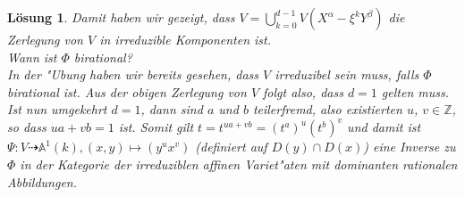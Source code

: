 \documentclass[a4paper, 12pt, numbers=noendperiod, chapterprefix=true, headsepline]{scrbook}
\theoremstyle{break}
\newtheorem{Loes}{L\"osung}
\theoremstyle{nonumberbreak}
\theoremstyle{nonumberplain}
\newcommand{\Z}{\mathbb{Z}}
\newcommand{\A}{\mathbb{A}}
\begin{document}
\begin{Loes}
Damit haben wir gezeigt, dass $V = \bigcup_{k=0}^{d-1} V(X^\alpha - \xi^k Y^\beta)$ die Zerlegung von $V$ in irreduzible Komponenten ist.\\

\emph{Wann ist $\Phi$ birational?}\\
In der "Ubung haben wir bereits gesehen, dass $V$ irreduzibel sein muss, falls $\Phi$ birational ist. Aus der obigen Zerlegung von $V$ folgt also, dass $d=1$ gelten muss. Ist nun umgekehrt $d=1$, dann sind $a$ und $b$ teilerfremd, also existierten $u$, $v \in \Z$, so dass $ua+vb=1$ ist. Somit gilt $t = t^{ua+vb} = (t^a)^u (t^b)^v$ und damit ist $\Psi: V \dashrightarrow \A^1(k), (x,y) \mapsto(y^ux^v)$ (definiert auf $D(y) \cap D(x)$) eine Inverse zu $\Phi$ in der Kategorie der irreduziblen affinen Variet"aten mit dominanten rationalen Abbildungen.
\end{Loes}
\end{document}
